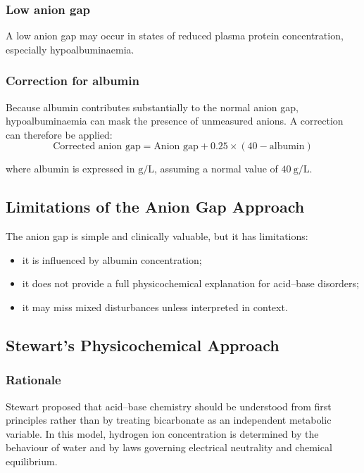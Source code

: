 \documentclass[11pt,a4paper]{article}
\begin{document}
\subsubsection{Low anion gap}

A low anion gap may occur in states of reduced plasma protein concentration, especially hypoalbuminaemia.

\subsubsection{Correction for albumin}

Because albumin contributes substantially to the normal anion gap, hypoalbuminaemia can mask the presence of unmeasured anions. A correction can therefore be applied:
\[
\text{Corrected anion gap} = \text{Anion gap} + 0.25 \times (40 - \text{albumin})
\]

where albumin is expressed in \(\mathrm{g/L}\), assuming a normal value of \(40~\mathrm{g/L}\).

\subsection{Limitations of the Anion Gap Approach}

The anion gap is simple and clinically valuable, but it has limitations:
\begin{itemize}
    \item it is influenced by albumin concentration;
    \item it does not provide a full physicochemical explanation for acid--base disorders;
    \item it may miss mixed disturbances unless interpreted in context.
\end{itemize}

\subsection{Stewart's Physicochemical Approach}

\subsubsection{Rationale}

Stewart proposed that acid--base chemistry should be understood from first principles rather than by treating bicarbonate as an independent metabolic variable. In this model, hydrogen ion concentration is determined by the behaviour of water and by laws governing electrical neutrality and chemical equilibrium.
\end{document}
